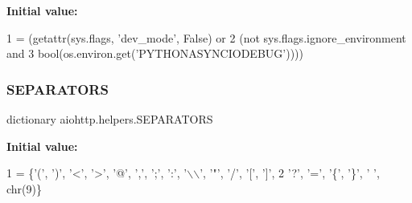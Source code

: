 {\bfseries Initial value\+:}
\begin{DoxyCode}
1 =  (getattr(sys.flags, \textcolor{stringliteral}{'dev\_mode'}, \textcolor{keyword}{False}) \textcolor{keywordflow}{or}
2          (\textcolor{keywordflow}{not} sys.flags.ignore\_environment \textcolor{keywordflow}{and}
3           bool(os.environ.get(\textcolor{stringliteral}{'PYTHONASYNCIODEBUG'}))))
\end{DoxyCode}
\mbox{\label{namespaceaiohttp_1_1helpers_ab3e2955ea4ecd60eb1dcd529a818d253}} 
\subsubsection{\texorpdfstring{S\+E\+P\+A\+R\+A\+T\+O\+RS}{SEPARATORS}}
{\footnotesize\ttfamily dictionary aiohttp.\+helpers.\+S\+E\+P\+A\+R\+A\+T\+O\+RS}

{\bfseries Initial value\+:}
\begin{DoxyCode}
1 =  \{\textcolor{stringliteral}{'('}, \textcolor{stringliteral}{')'}, \textcolor{stringliteral}{'<'}, \textcolor{stringliteral}{'>'}, \textcolor{stringliteral}{'@'}, \textcolor{stringliteral}{','}, \textcolor{stringliteral}{';'}, \textcolor{stringliteral}{':'}, \textcolor{stringliteral}{'\(\backslash\)\(\backslash\)'}, \textcolor{stringliteral}{'"'}, \textcolor{stringliteral}{'/'}, \textcolor{stringliteral}{'['}, \textcolor{stringliteral}{']'},
2               \textcolor{stringliteral}{'?'}, \textcolor{stringliteral}{'='}, \textcolor{stringliteral}{'\{'}, \textcolor{stringliteral}{'\}'}, \textcolor{stringliteral}{' '}, chr(9)\}
\end{DoxyCode}

